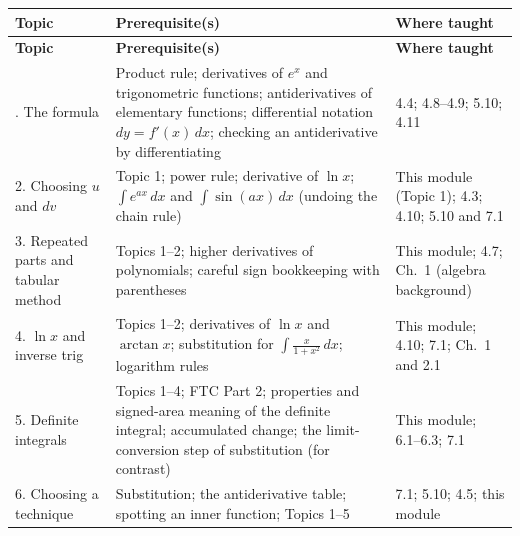 \documentclass[11pt]{article}
\begin{document}
\begin{longtable}{p{3.2cm}p{6.9cm}p{4.7cm}}
\toprule
\textbf{Topic} & \textbf{Prerequisite(s)} & \textbf{Where taught} \\
\midrule
\endfirsthead
\toprule
\textbf{Topic} & \textbf{Prerequisite(s)} & \textbf{Where taught} \\
\midrule
\endhead
\bottomrule
\endfoot
1. The formula & Product rule; derivatives of $e^x$ and trigonometric functions; antiderivatives of elementary functions; differential notation $dy=f'(x)\,dx$; checking an antiderivative by differentiating & 4.4; 4.8--4.9; 5.10; 4.11 \\
2. Choosing $u$ and $dv$ & Topic 1; power rule; derivative of $\ln x$; $\int e^{ax}\,dx$ and $\int\sin(ax)\,dx$ (undoing the chain rule) & This module (Topic 1); 4.3; 4.10; 5.10 and 7.1 \\
3. Repeated parts and tabular method & Topics 1--2; higher derivatives of polynomials; careful sign bookkeeping with parentheses & This module; 4.7; Ch.~1 (algebra background) \\
4. $\ln x$ and inverse trig & Topics 1--2; derivatives of $\ln x$ and $\arctan x$; substitution for $\int \frac{x}{1+x^2}\,dx$; logarithm rules & This module; 4.10; 7.1; Ch.~1 and 2.1 \\
5. Definite integrals & Topics 1--4; FTC Part 2; properties and signed-area meaning of the definite integral; accumulated change; the limit-conversion step of substitution (for contrast) & This module; 6.1--6.3; 7.1 \\
6. Choosing a technique & Substitution; the antiderivative table; spotting an inner function; Topics 1--5 & 7.1; 5.10; 4.5; this module \\
\end{longtable}
\end{document}
